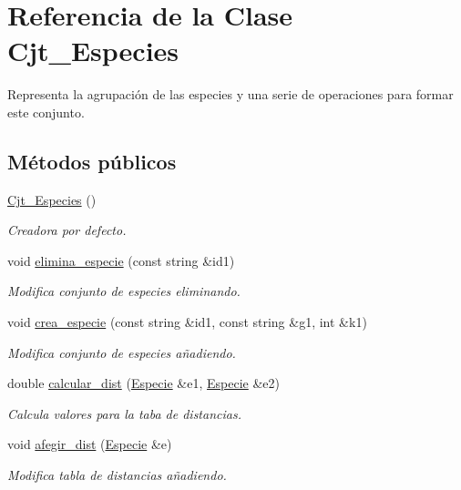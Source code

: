 \hypertarget{class_cjt___especies}{}\section{Referencia de la Clase Cjt\+\_\+\+Especies}
\label{class_cjt___especies}


Representa la agrupación de las especies y una serie de operaciones para formar este conjunto.  


\subsection*{Métodos públicos}
\begin{DoxyCompactItemize}
\item 
\hyperlink{class_cjt___especies_ae423b9d5a456158136c17d9210c90c2e}{Cjt\+\_\+\+Especies} ()
\begin{DoxyCompactList}\small\item\em Creadora por defecto. \end{DoxyCompactList}\item 
void \hyperlink{class_cjt___especies_aefad42bebc96b7bc924053630b365fbd}{elimina\+\_\+especie} (const string \&id1)
\begin{DoxyCompactList}\small\item\em Modifica conjunto de especies eliminando. \end{DoxyCompactList}\item 
void \hyperlink{class_cjt___especies_a94019f4a9bb2117abf8d0d1aa507fe2e}{crea\+\_\+especie} (const string \&id1, const string \&g1, int \&k1)
\begin{DoxyCompactList}\small\item\em Modifica conjunto de especies añadiendo. \end{DoxyCompactList}\item 
double \hyperlink{class_cjt___especies_a318c7df32ed58b513c623668772c3f84}{calcular\+\_\+dist} (\hyperlink{class_especie}{Especie} \&e1, \hyperlink{class_especie}{Especie} \&e2)
\begin{DoxyCompactList}\small\item\em Calcula valores para la taba de distancias. \end{DoxyCompactList}\item 
void \hyperlink{class_cjt___especies_afc5f0e3bb5b236081ba71afc3f94df96}{afegir\+\_\+dist} (\hyperlink{class_especie}{Especie} \&e)
\begin{DoxyCompactList}\small\item\em Modifica tabla de distancias añadiendo. \end{DoxyCompactList}\item 

\end{DoxyCompactItemize}
